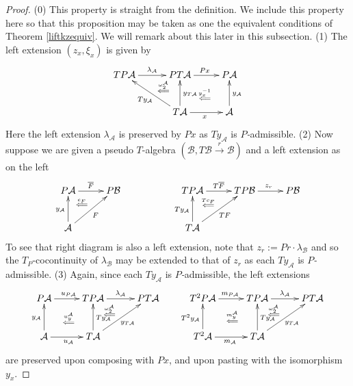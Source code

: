 \documentclass[a4paper,oneside,english]{amsart}
\numberwithin{equation}{section}
\numberwithin{figure}{section}
\theoremstyle{plain}
\theoremstyle{definition}
\theoremstyle{remark}
\theoremstyle{definition}
\theoremstyle{plain}
\theoremstyle{plain}
\theoremstyle{plain}
\begin{document}
\begin{proof}
(0) This property is straight from the definition. We include this
property here so that this proposition may be taken as one the equivalent
conditions of Theorem \ref{liftkzequiv}. We will remark about this
later in this subsection. (1) The left extension $\left(z_{x},\xi_{x}\right)$
is given by
\[
\xymatrix@=1em{TP\mathcal{A}\ar[rr]^{\lambda_{\mathcal{A}}} &  & PT\mathcal{A}\ar@{}[dl]|-{\stackrel{\omega_{2}^{\mathcal{A}}}{\Longleftarrow}}\ar[rr]^{Px}\ar@{}[drdr]|-{\stackrel{y_{x}^{-1}}{\Longleftarrow}} &  & P\mathcal{A}\\
 & \;\\
 &  & T\mathcal{A}\ar[uu]_{y_{T\mathcal{A}}}\ar[uull]^{Ty_{\mathcal{A}}}\ar[rr]_{x} &  & \mathcal{A}\ar[uu]_{y_{\mathcal{A}}}
}
\]
Here the left extension $\lambda_{\mathcal{A}}$ is preserved by $Px$
as $Ty_{\mathcal{A}}$ is \emph{$P$-}admissible. (2) Now suppose
we are given a pseudo $T$-algebra $\left(\mathcal{B},T\mathcal{B}\overset{r}{\rightarrow}\mathcal{B}\right)$
and a left extension as on the left
\[
\xymatrix@=1em{P\mathcal{A}\ar[rr]^{\overline{F}} &  & P\mathcal{B} &  &  &  & TP\mathcal{A}\ar[rr]^{T\overline{F}} &  & TP\mathcal{B}\ar[rr]^{z_{r}} &  & P\mathcal{B}\\
 & \ar@{}[ul]|-{\overset{c_{F}}{\Longleftarrow}} &  &  &  &  &  & \ar@{}[ul]|-{\overset{Tc_{F}}{\Longleftarrow}}\\
\mathcal{A}\ar[uu]^{y_{\mathcal{A}}}\ar[uurr]_{F} &  &  &  &  &  & T\mathcal{A}\ar[uu]^{Ty_{\mathcal{A}}}\ar[uurr]_{TF}
}
\]
To see that right diagram is also a left extension, note that $z_{r}:=Pr\cdot\lambda_{\mathcal{B}}$
and so the $T_{P}$-cocontinuity of $\lambda_{\mathcal{B}}$ may be
extended to that of $z_{r}$ as each $Ty_{\mathcal{A}}$ is \emph{$P$-}admissible.
(3) Again, since each $Ty_{\mathcal{A}}$ is \emph{$P$-}admissible,
the left extensions
\[
\xymatrix@=1em{P\mathcal{A}\ar[rr]^{u_{P\mathcal{A}}} &  & TP\mathcal{A}\ar@{}[dldl]|-{\overset{u_{y}^{\mathcal{A}}}{\Longleftarrow}}\ar[rr]^{\lambda_{\mathcal{A}}}\ar@{}[dr]|-{\overset{\omega_{2}^{\mathcal{A}}}{\Longleftarrow}} &  & PT\mathcal{A} &  & T^{2}P\mathcal{A}\ar[rr]^{m_{P\mathcal{A}}} &  & TP\mathcal{A}\ar@{}[dldl]|-{\overset{m_{y}^{\mathcal{A}}}{\Longleftarrow}}\ar[rr]^{\lambda_{\mathcal{A}}}\ar@{}[dr]|-{\overset{\omega_{2}^{\mathcal{A}}}{\Longleftarrow}} &  & PT\mathcal{A}\\
 &  &  & \; &  &  &  &  &  & \;\\
\mathcal{A}\ar[rr]_{u_{\mathcal{A}}}\ar[uu]^{y_{\mathcal{A}}} &  & T\mathcal{A}\ar[uu]_{Ty_{\mathcal{A}}}\ar[uurr]_{y_{T\mathcal{A}}} &  &  &  & T^{2}\mathcal{A}\ar[rr]_{m_{\mathcal{A}}}\ar[uu]^{T^{2}y_{\mathcal{A}}} &  & T\mathcal{A}\ar[uu]_{Ty_{\mathcal{A}}}\ar[uurr]_{y_{T\mathcal{A}}}
}
\]
are preserved upon composing with $Px$, and upon pasting with the
isomorphism $y_{x}$.\end{proof}
\end{document}
